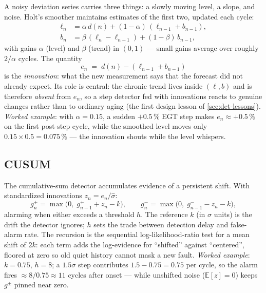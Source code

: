A noisy deviation series carries three things: a slowly moving level, a slope, and noise.
Holt's smoother maintains estimates of the first two, updated each cycle:
\begin{align}
  \ell_n &= \alpha\, d(n) + (1-\alpha)\,(\ell_{n-1} + b_{n-1}), \nonumber\\
  b_n    &= \beta\,(\ell_n - \ell_{n-1}) + (1-\beta)\, b_{n-1},
  \label{eq:holt}
\end{align}
with gains $\alpha$ (level) and $\beta$ (trend) in $(0,1)$ --- small gains average over
roughly $2/\alpha$ cycles. The quantity
\begin{equation}
  e_n \;=\; d(n) - (\ell_{n-1} + b_{n-1})
  \label{eq:innovation}
\end{equation}
is the \emph{innovation}: what the new measurement says that the forecast did not already
expect. Its role is central: the chronic trend lives inside $(\ell, b)$ and is therefore
\emph{absent} from $e_n$, so a step detector fed with innovations reacts to genuine changes
rather than to ordinary aging (the first design lesson of \cref{sec:det-lessons}).
\emph{Worked example}: with $\alpha=0.15$, a sudden $+0.5\,\%$ EGT step makes
$e_n \approx +0.5\,\%$ on the first post-step cycle, while the smoothed level moves only
$0.15 \times 0.5 = 0.075\,\%$ --- the innovation shouts while the level whispers.

\subsection{CUSUM}
\label{sec:math-cusum}

The cumulative-sum detector accumulates evidence of a persistent shift. With standardized
innovations $z_n = e_n/\hat\sigma$:
\begin{equation}
  g_n^{+} = \max\!\bigl(0,\; g_{n-1}^{+} + z_n - k\bigr), \qquad
  g_n^{-} = \max\!\bigl(0,\; g_{n-1}^{-} - z_n - k\bigr),
  \label{eq:cusum}
\end{equation}
alarming when either exceeds a threshold $h$. The reference $k$ (in $\sigma$ units) is the
drift the detector ignores; $h$ sets the trade between detection delay and false-alarm
rate. The recursion is the sequential log-likelihood-ratio test for a mean shift of $2k$:
each term adds the log-evidence for ``shifted'' against ``centered'', floored at zero so
old quiet history cannot mask a new fault. \emph{Worked example}: $k=0.75$, $h=8$; a
$1.5\sigma$ step contributes $1.5-0.75 = 0.75$ per cycle, so the alarm fires
$\approx 8/0.75 \approx 11$ cycles after onset --- while unshifted noise ($\mathbb{E}[z]=0$)
keeps $g^{\pm}$ pinned near zero.

